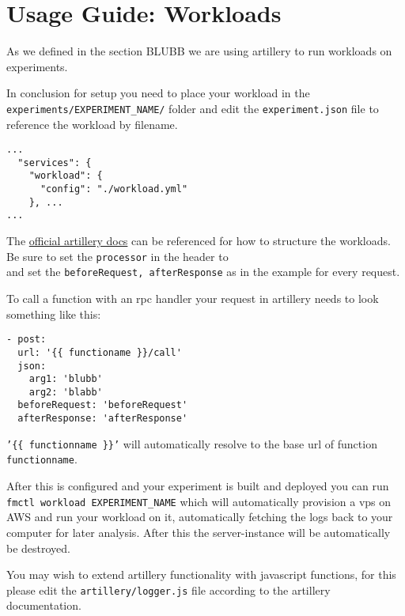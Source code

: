 \documentclass[../main.tex]{subfiles}
\begin{document}
\section{Usage Guide: Workloads}\label{sec:WorkloadsUsage}

As we defined in the section BLUBB we are using artillery to run workloads on experiments.   %

In conclusion for setup you need to place your workload in the \\
\texttt{experiments/EXPERIMENT\_NAME/} 
folder and edit the \texttt{experiment.json} file to reference the workload by filename.
\begin{tcolorbox}[titleDetachedStyle, title=\texttt{experiment.json}]
\begin{verbatim}
...
  "services": {
    "workload": {
      "config": "./workload.yml"
    }, ...
...
\end{verbatim}
\end{tcolorbox}

The \href{https://artillery.io/docs/}{official artillery docs} can be referenced for how to structure the workloads. Be sure to set the \texttt{processor} in the header to \\ and set the \texttt{beforeRequest, afterResponse} as in the example  for every request. 



To call a function with an rpc handler your request in artillery needs to look something like this:

\begin{tcolorbox}[titleDetachedStyle, title=\texttt{workload.yml}]
\begin{verbatim}
- post:
  url: '{{ functioname }}/call'
  json:
    arg1: 'blubb' 
    arg2: 'blabb'
  beforeRequest: 'beforeRequest'
  afterResponse: 'afterResponse'
\end{verbatim}
\end{tcolorbox}

\texttt{'\{\{ functionname \}\}'} will automatically resolve to the base url of function \texttt{functionname}.

After this is configured and your experiment is built and deployed you can run \texttt{fmctl workload EXPERIMENT\_NAME} which will automatically provision a vps on AWS and run your workload on it, automatically fetching the logs back to your computer for later analysis. After this the server-instance will be automatically be destroyed.

You may wish to extend artillery functionality with javascript functions, for this please edit the \texttt{artillery/logger.js} file according to the artillery documentation.
\end{document}
